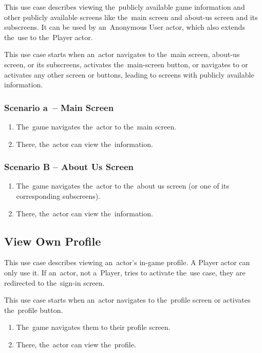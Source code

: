 This use case describes viewing the~publicly available game information and other publicly available screens like the~main screen and about-us screen and its subscreens.
It can be used by an~Anonymous User actor, which also extends the~use to the~Player actor.

This use case starts when an~actor navigates to the~main screen, about-us screen, or its subscreens, activates the~main-screen button, or navigates to or activates any other screen or buttons, leading to screens with publicly available information.

\subsubsection*{Scenario a~-- Main Screen}

\begin{enumerate}
    \item The~game navigates the~actor to the~main screen.
    \item There, the~actor can view the~information.
\end{enumerate}

\subsubsection*{Scenario B -- About Us Screen}

\begin{enumerate}
    \item The~game navigates the~actor to the~about us screen (or one of its corresponding subscreens).
    \item There, the~actor can view the~information.
\end{enumerate}

\subsection{View Own Profile}

This use case describes viewing an~actor's in-game profile.
A Player actor can only use it.
If an~actor, not a~Player, tries to activate the~use case, they are redirected to the~sign-in screen.

This use case starts when an~actor navigates to the~profile screen or activates the~profile button.

\begin{enumerate}
    \item The~game navigates them to their profile screen.
    \item There, the~actor can view the~profile.
\end{enumerate}

